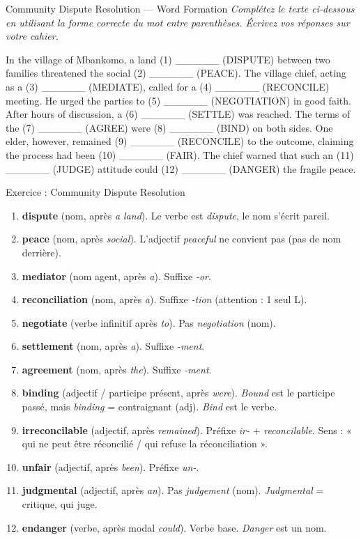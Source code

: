 \documentclass[11pt]{article}
\begin{document}
\begin{exercice}{Community Dispute Resolution — Word Formation}
\emph{Complétez le texte ci-dessous en utilisant la forme correcte du mot entre parenthèses. Écrivez vos réponses sur votre cahier.}

In the village of Mbankomo, a land (1) \_\_\_\_\_\_ (DISPUTE) between two families threatened the social (2) \_\_\_\_\_\_ (PEACE). The village chief, acting as a (3) \_\_\_\_\_\_ (MEDIATE), called for a (4) \_\_\_\_\_\_ (RECONCILE) meeting. He urged the parties to (5) \_\_\_\_\_\_ (NEGOTIATION) in good faith. After hours of discussion, a (6) \_\_\_\_\_\_ (SETTLE) was reached. The terms of the (7) \_\_\_\_\_\_ (AGREE) were (8) \_\_\_\_\_\_ (BIND) on both sides. One elder, however, remained (9) \_\_\_\_\_\_ (RECONCILE) to the outcome, claiming the process had been (10) \_\_\_\_\_\_ (FAIR). The chief warned that such an (11) \_\_\_\_\_\_ (JUDGE) attitude could (12) \_\_\_\_\_\_ (DANGER) the fragile peace.
\end{exercice}

\begin{corrige}{Exercice : Community Dispute Resolution}
\begin{enumerate}
\item \textbf{dispute} (nom, après \emph{a land}). Le verbe est \emph{dispute}, le nom s'écrit pareil.
\item \textbf{peace} (nom, après \emph{social}). L'adjectif \emph{peaceful} ne convient pas (pas de nom derrière).
\item \textbf{mediator} (nom agent, après \emph{a}). Suffixe \emph{-or}.
\item \textbf{reconciliation} (nom, après \emph{a}). Suffixe \emph{-tion} (attention : 1 seul L).
\item \textbf{negotiate} (verbe infinitif après \emph{to}). Pas \emph{negotiation} (nom).
\item \textbf{settlement} (nom, après \emph{a}). Suffixe \emph{-ment}.
\item \textbf{agreement} (nom, après \emph{the}). Suffixe \emph{-ment}.
\item \textbf{binding} (adjectif / participe présent, après \emph{were}). \emph{Bound} est le participe passé, mais \emph{binding} = contraignant (adj). \emph{Bind} est le verbe.
\item \textbf{irreconcilable} (adjectif, après \emph{remained}). Préfixe \emph{ir-} + \emph{reconcilable}. Sens : « qui ne peut être réconcilié / qui refuse la réconciliation ».
\item \textbf{unfair} (adjectif, après \emph{been}). Préfixe \emph{un-}.
\item \textbf{judgmental} (adjectif, après \emph{an}). Pas \emph{judgement} (nom). \emph{Judgmental} = critique, qui juge.
\item \textbf{endanger} (verbe, après modal \emph{could}). Verbe base. \emph{Danger} est un nom.
\end{enumerate}
\end{corrige}
\end{document}
